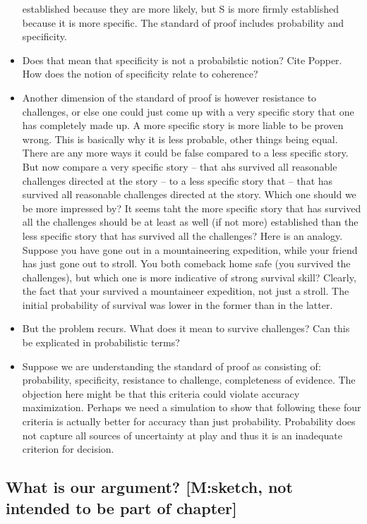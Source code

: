\documentclass[
  10pt,
  dvipsnames,enabledeprecatedfontcommands]{scrartcl}
\begin{document}
\begin{itemize}
  established because they are more likely, but S is more firmly
  established because it is more specific. The standard of proof
  includes probability and specificity.
\item
  Does that mean that specificity is not a probabilstic notion? Cite
  Popper. How does the notion of specificity relate to coherence?
\item
  Another dimension of the standard of proof is however resistance to
  challenges, or else one could just come up with a very specific story
  that one has completely made up. A more specific story is more liable
  to be proven wrong. This is basically why it is less probable, other
  things being equal. There are any more ways it could be false compared
  to a less specific story. But now compare a very specific story --
  that ahs survived all reasonable challenges directed at the story --
  to a less specific story that -- that has survived all reasonable
  challenges directed at the story. Which one should we be more
  impressed by? It seems taht the more specific story that has survived
  all the challenges should be at least as well (if not more)
  established than the less specific story that has survived all the
  challenges? Here is an analogy. Suppose you have gone out in a
  mountaineering expedition, while your friend has just gone out to
  stroll. You both comeback home safe (you survived the challenges), but
  which one is more indicative of strong survival skill? Clearly, the
  fact that your survived a mountaineer expedition, not just a stroll.
  The initial probability of survival was lower in the former than in
  the latter.
\item
  But the problem recurs. What does it mean to survive challenges? Can
  this be explicated in probabilistic terms?
\item
  Suppose we are understanding the standard of proof as consisting of:
  probability, specificity, resistance to challenge, completeness of
  evidence. The objection here might be that this criteria could violate
  accuracy maximization. Perhaps we need a simulation to show that
  following these four criteria is actually better for accuracy than
  just probability. Probability does not capture all sources of
  uncertainty at play and thus it is an inadequate criterion for
  decision.
\end{itemize}

\hypertarget{what-is-our-argument-msketch-not-intended-to-be-part-of-chapter}{%
\subsection{What is our argument? {[}M:sketch, not intended to be part
of
chapter{]}}\label{what-is-our-argument-msketch-not-intended-to-be-part-of-chapter}}
\end{document}
